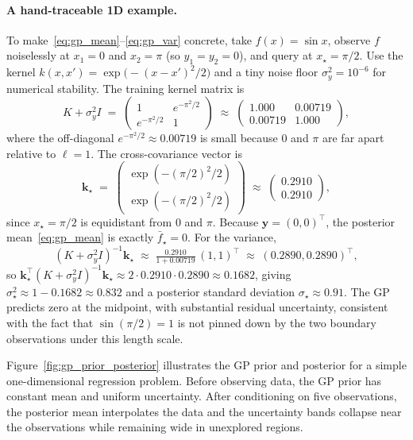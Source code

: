 \documentclass[11pt,a4paper]{report}
\begin{document}
\paragraph{A hand-traceable 1D example.}  To make~\eqref{eq:gp_mean}--\eqref{eq:gp_var} concrete, take $f(x) = \sin x$, observe $f$ noiselessly at $x_1 = 0$ and $x_2 = \pi$ (so $y_1 = y_2 = 0$), and query at $x_\star = \pi/2$.  Use the kernel $k(x, x') = \exp\!\bigl(-(x - x')^2/2\bigr)$ and a tiny noise floor $\sigma_y^2 = 10^{-6}$ for numerical stability.  The training kernel matrix is
\[
K + \sigma_y^2 I \;=\;
\begin{pmatrix} 1 & e^{-\pi^2/2} \\ e^{-\pi^2/2} & 1 \end{pmatrix}
\;\approx\;
\begin{pmatrix} 1.000 & 0.00719 \\ 0.00719 & 1.000 \end{pmatrix},
\]
where the off-diagonal $e^{-\pi^2/2} \approx 0.00719$ is small because $0$ and $\pi$ are far apart relative to $\ell = 1$.  The cross-covariance vector is
\[
\bm k_\star \;=\;
\begin{pmatrix} \exp(-(\pi/2)^2/2) \\ \exp(-(\pi/2)^2/2) \end{pmatrix}
\;\approx\;
\begin{pmatrix} 0.2910 \\ 0.2910 \end{pmatrix},
\]
since $x_\star = \pi/2$ is equidistant from $0$ and $\pi$.  Because $\bm y = (0,0)^\top$, the posterior mean~\eqref{eq:gp_mean} is exactly $\bar f_\star = 0$.  For the variance,
\[
(K + \sigma_y^2 I)^{-1} \bm k_\star \;\approx\; \tfrac{0.2910}{1 + 0.00719}\,(1, 1)^\top \;\approx\; (0.2890, 0.2890)^\top,
\]
so $\bm k_\star^\top (K + \sigma_y^2 I)^{-1} \bm k_\star \approx 2 \cdot 0.2910 \cdot 0.2890 \approx 0.1682$, giving $\sigma_\star^2 \approx 1 - 0.1682 \approx 0.832$ and a posterior standard deviation $\sigma_\star \approx 0.91$.  The GP predicts zero at the midpoint, with substantial residual uncertainty, consistent with the fact that $\sin(\pi/2) = 1$ is not pinned down by the two boundary observations under this length scale.

Figure~\ref{fig:gp_prior_posterior} illustrates the GP prior and posterior for a simple one-dimensional regression problem.  Before observing data, the GP prior has constant mean and uniform uncertainty.  After conditioning on five observations, the posterior mean interpolates the data and the uncertainty bands collapse near the observations while remaining wide in unexplored regions.
\end{document}

